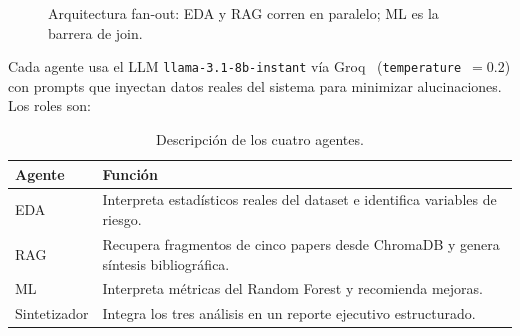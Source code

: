 \documentclass[11pt, a4paper]{article}
\begin{document}
\begin{figure}[H]
\centering
{}
\caption{Arquitectura fan-out: EDA y RAG corren en paralelo; ML es la barrera de join.}
\label{fig:arq}
\end{figure}

Cada agente usa el LLM \texttt{llama-3.1-8b-instant} vía Groq~\cite{groq2024}
(\texttt{temperature}~$=0.2$) con prompts que inyectan datos reales del
sistema para minimizar alucinaciones. Los roles son:

\begin{table}[H]
  \centering\small
  \caption{Descripción de los cuatro agentes.}
  \label{tab:agentes}
  \begin{tabularx}{\textwidth}{lX}
    \toprule
    \textbf{Agente} & \textbf{Función} \\
    \midrule
    EDA          & Interpreta estadísticos reales del dataset e identifica variables de riesgo. \\
    RAG          & Recupera fragmentos de cinco papers desde ChromaDB y genera síntesis bibliográfica. \\
    ML           & Interpreta métricas del Random Forest y recomienda mejoras. \\
    Sintetizador & Integra los tres análisis en un reporte ejecutivo estructurado. \\
    \bottomrule
  \end{tabularx}
\end{table}
\end{document}

